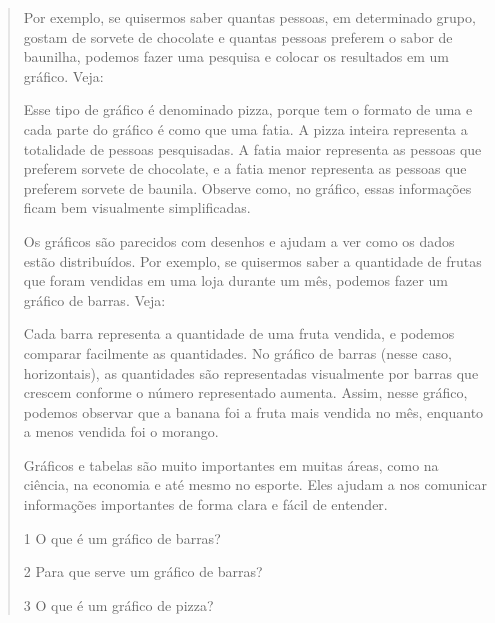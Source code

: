 \begin{quote}
{Por exemplo, se quisermos saber quantas pessoas, em determinado grupo, gostam de sorvete de chocolate e
quantas pessoas preferem o sabor de baunilha, podemos fazer uma pesquisa e colocar
os resultados em um gráfico. Veja:


Esse tipo de gráfico é denominado pizza, porque tem o formato de uma e cada parte do gráfico é como que uma fatia.
A pizza inteira representa a totalidade de pessoas pesquisadas. A fatia maior representa as pessoas que preferem sorvete de chocolate, e a fatia menor representa as pessoas que preferem sorvete de baunila. Observe como, no gráfico, essas informações ficam bem visualmente simplificadas.

Os gráficos são parecidos com desenhos e ajudam a ver como os dados
estão distribuídos. Por exemplo, se quisermos saber a quantidade de
frutas que foram vendidas em uma loja durante um mês, podemos fazer um
gráfico de barras. Veja:


Cada barra representa a quantidade de uma fruta
vendida, e podemos comparar facilmente as quantidades. No gráfico de
barras (nesse caso, horizontais), as quantidades são representadas visualmente por barras que
crescem conforme o número representado aumenta. Assim, nesse gráfico, podemos
observar que a banana foi a fruta mais vendida no mês, enquanto a menos vendida foi o morango.

Gráficos e tabelas são muito importantes em muitas áreas, como na
ciência, na economia e até mesmo no esporte. Eles ajudam a nos comunicar
informações importantes de forma clara e fácil de entender.}


\num{1} O que é um gráfico de barras?



\num{2} Para que serve um gráfico de barras?



\num{3} O que é um gráfico de pizza?



\end{quote}
